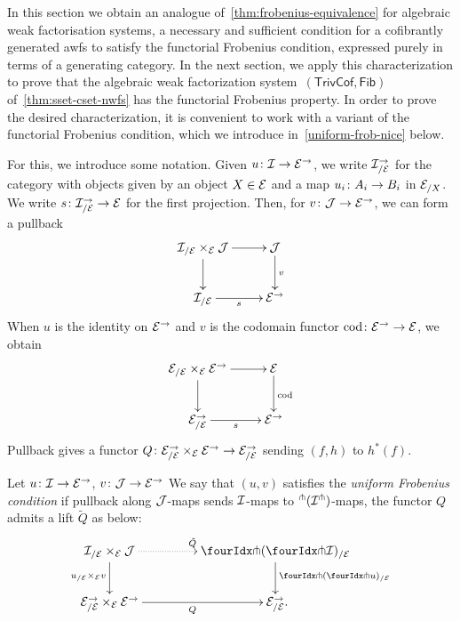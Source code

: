 \documentclass[reqno,10pt,a4paper,oneside,draft]{amsart}
\begin{document}
{{In this section we obtain an analogue of~\cref{thm:frobenius-equivalence} for algebraic weak factorisation systems, \ie 
a necessary and sufficient condition for a cofibrantly generated awfs  to satisfy the functorial Frobenius condition, expressed 
purely in terms of a generating category. In the next section, we apply this characterization  to prove that the algebraic weak 
factorization system~$(\mathsf{TrivCof}, \mathsf{Fib})$ of~\cref{thm:sset-cset-nwfs} has the functorial Frobenius property. 
In order to prove the desired characterization, it is convenient to work with a variant of the functorial Frobenius condition,
which we introduce in~\cref{uniform-frob-nice} below. 

For this, we  introduce some notation. Given $u \co \cal{I} \to \cal{E}^\to$, we write $\cal{I}_{/\cal{E}}^{\to}$ for the category with objects
given by an object $X \in \cal{E}$ and a map  $u_i \co A_i \to B_i$ in $\cal{E}_{/X}$. We write $s \co \cal{I}_{/\cal{E}}^{\to} \to \cal{E}$ for the first projection. Then, for $v \co \cal{J} \to \cal{E}^\to$, we can form a pullback
\[
\xymatrix{
 \cal{I}_{/\cal{E}} \times_{\cal{E}} \cal{J} \ar[r] \ar[d] & 
 \cal{J} \ar[d]^v \\
  \cal{I}_{/\cal{E}} \ar[r]_s &
  \cal{E}^\to}
  \]
When $u$ is the identity on $\cal{E}^\to$ and $v$ is the codomain functor $\cod \co \cal{E}^\to \to \cal{E}$, we obtain
\[
\xymatrix{
 \cal{E}_{/\cal{E}} \times_{\cal{E}} \cal{E}^\to \ar[r] \ar[d] & 
 \cal{E} \ar[d]^{\cod} \\
  \cal{E}^\to_{/\cal{E}} \ar[r]_s &
  \cal{E}^\to}
  \]
Pullback gives a functor $Q \co  \cal{E}^\to_{/\cal{E}} \times_{\cal{E}} \cal{E}^\to \to \cal{E}_{/\cal{E}}^\to$
sending $(f, h)$ to $h^*(f)$. 



\begin{definition} \label{uniform-frob-nice} Let $u \co \cal{I} \to \cal{E}^\to$, $v \co \cal{J} \to \catE^\to$
We say that $(u, v)$  satisfies the \emph{uniform Frobenius condition} if
pullback along $\cal{J}$-maps sends $\cal{I}$-maps to ${}^\pitchfork(\cal{I}^\pitchfork)$-maps, \ie the functor $Q$ admits a lift $\tilde{Q}$ as below:
\begin{equation} \label{uniform-frob-nice:lift}
\begin{gathered}
\xymatrix@C+2em{
  \cal{I}_{/\cal{E}} \times_{\cal{E}} \cal{J}
  \ar@{.>}[r]^{\tilde{Q}}
  \ar[d]_{u_{/\cal{E}} \times_{\cal{E}} v}
&
  \liftl{(\liftr{\cal{I}})}_{/\cal{E}}
  \ar[d]^{\liftl{(\liftr{u})}_{/\cal{E}}}
\\
  \cal{E}^\to_{/\cal{E}} \times_{\cal{E}} \cal{E}^\to
  \ar[r]_{Q}
&
  \cal{E}_{/\cal{E}}^\to
\rlap{.}}
\end{gathered}
\end{equation}
\end{definition}

}}
\end{document}
